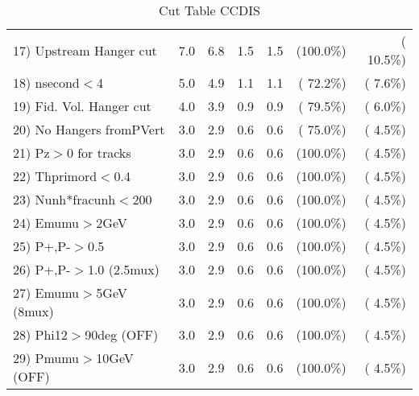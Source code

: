 \begin{table}[h!]
\begin{tabular}{||l||r|r|r|r|r|r||}
 17) Upstream Hanger cut  &          7.0 &          6.8 &          1.5 &          1.5 & (100.0\%) & ( 10.5\%) \\
 18) nsecond$<$4          &          5.0 &          4.9 &          1.1 &          1.1 & ( 72.2\%) & (  7.6\%) \\
 19) Fid. Vol. Hanger cut &          4.0 &          3.9 &          0.9 &          0.9 & ( 79.5\%) & (  6.0\%) \\
 20) No Hangers fromPVert &          3.0 &          2.9 &          0.6 &          0.6 & ( 75.0\%) & (  4.5\%) \\
 21) Pz$>$0 for tracks    &          3.0 &          2.9 &          0.6 &          0.6 & (100.0\%) & (  4.5\%) \\
 22) Thprimord$<$0.4      &          3.0 &          2.9 &          0.6 &          0.6 & (100.0\%) & (  4.5\%) \\
 23) Nunh*fracunh$<$200   &          3.0 &          2.9 &          0.6 &          0.6 & (100.0\%) & (  4.5\%) \\
 24) Emumu$>$2GeV         &          3.0 &          2.9 &          0.6 &          0.6 & (100.0\%) & (  4.5\%) \\
 25) P+,P-$>$0.5          &          3.0 &          2.9 &          0.6 &          0.6 & (100.0\%) & (  4.5\%) \\
 26) P+,P-$>$1.0 (2.5mux) &          3.0 &          2.9 &          0.6 &          0.6 & (100.0\%) & (  4.5\%) \\
 27) Emumu$>$5GeV  (8mux) &          3.0 &          2.9 &          0.6 &          0.6 & (100.0\%) & (  4.5\%) \\
 28) Phi12$>$90deg  (OFF) &          3.0 &          2.9 &          0.6 &          0.6 & (100.0\%) & (  4.5\%) \\
 29) Pmumu$>$10GeV  (OFF) &          3.0 &          2.9 &          0.6 &          0.6 & (100.0\%) & (  4.5\%) \\
 \hline
 \hline
 \end{tabular}
 \caption{Cut Table  CCDIS    }
 \label{tab-cutcohjpsi-mumu_ncdis}
 \end{table}
